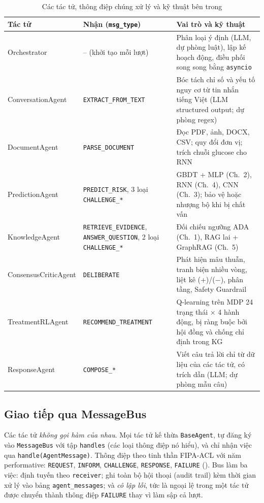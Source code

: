 \begin{table}[H]
\centering
\caption{Các tác tử, thông điệp chúng xử lý và kỹ thuật bên trong}
\label{tab:agents}
\small
\begin{tabularx}{\linewidth}{@{}L{3.1cm}L{4.3cm}Y@{}}
\toprule
\textbf{Tác tử} & \textbf{Nhận (\texttt{msg\_type})} & \textbf{Vai trò và kỹ thuật} \\
\midrule
Orchestrator & -- (khởi tạo mỗi lượt) & Phân loại ý định (LLM, dự phòng luật), lập kế hoạch động, điều phối song song bằng \texttt{asyncio} \\
ConversationAgent & \texttt{EXTRACT\_FROM\_TEXT} & Bóc tách chỉ số và yếu tố nguy cơ từ tin nhắn tiếng Việt (LLM structured output; dự phòng regex) \\
DocumentAgent & \texttt{PARSE\_DOCUMENT} & Đọc PDF, ảnh, DOCX, CSV; quy đổi đơn vị; trích chuỗi glucose cho RNN \\
PredictionAgent & \texttt{PREDICT\_RISK}, 3 loại \texttt{CHALLENGE\_*} & GBDT + MLP (Ch.~2), RNN (Ch.~4), CNN (Ch.~3); bảo vệ hoặc nhượng bộ khi bị chất vấn \\
KnowledgeAgent & \texttt{RETRIEVE\_EVIDENCE}, \texttt{ANSWER\_QUESTION}, 2 loại \texttt{CHALLENGE\_*} & Đối chiếu ngưỡng ADA (Ch.~1), RAG lai + GraphRAG (Ch.~5) \\
ConsensusCriticAgent & \texttt{DELIBERATE} & Phát hiện mâu thuẫn, tranh biện nhiều vòng, liệt kê (+)/(−), phân tầng, Safety Guardrail \\
TreatmentRLAgent & \texttt{RECOMMEND\_TREATMENT} & Q-learning trên MDP 24 trạng thái × 4 hành động, bị ràng buộc bởi hội đồng và chống chỉ định trong KG \\
ResponseAgent & \texttt{COMPOSE\_*} & Viết câu trả lời chỉ từ dữ liệu của các tác tử, có trích dẫn (LLM; dự phòng mẫu câu) \\
\bottomrule
\end{tabularx}
\end{table}

\subsection{Giao tiếp qua MessageBus}

Các tác tử \emph{không gọi hàm của nhau}. Mọi tác tử kế thừa \texttt{BaseAgent}, tự đăng ký vào \texttt{MessageBus} với tập \texttt{handles} (các loại thông điệp nó hiểu), và chỉ nhận việc qua \texttt{handle(AgentMessage)}. Thông điệp theo tinh thần FIPA-ACL với năm performative: \texttt{REQUEST}, \texttt{INFORM}, \texttt{CHALLENGE}, \texttt{RESPONSE}, \texttt{FAILURE} (). Bus làm ba việc: định tuyến theo \texttt{receiver}; ghi toàn bộ hội thoại (audit trail) kèm thời gian xử lý vào bảng \texttt{agent\_messages}; và \emph{cô lập lỗi}, tức là ngoại lệ trong một tác tử được chuyển thành thông điệp \texttt{FAILURE} thay vì làm sập cả lượt.

